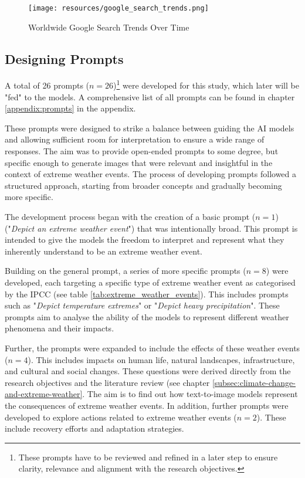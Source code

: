 \begin{figure}[h]
    \centering
    \texttt{[image: resources/google\_search\_trends.png]}
    \caption{Worldwide Google Search Trends Over Time}
    \label{fig:google_search_trends}
\end{figure}

\subsection{Designing Prompts}
\label{subsec:designing-prompts}

A total of 26 prompts ($n=26$)\footnote{These prompts have to be reviewed and refined in a later step to ensure clarity, relevance and alignment with the research objectives. } were developed for this study, which later will be "fed" to the models. A comprehensive list of all prompts can be found in chapter \ref{appendix:prompts} in the appendix.

These prompts were designed to strike a balance between guiding the AI models and allowing sufficient room for interpretation to ensure a wide range of responses. The aim was to provide open-ended prompts to some degree, but specific enough to generate images that were relevant and insightful in the context of extreme weather events. The process of developing prompts followed a structured approach, starting from broader concepts and gradually becoming more specific.

The development process began with the creation of a basic prompt  ($n=1$) ("\textit{Depict an extreme weather event}") that was intentionally broad. This prompt is intended to give the models the freedom to interpret and represent what they inherently understand to be an extreme weather event.

Building on the general prompt, a series of more specific prompts ($n=8$) were developed, each targeting a specific type of extreme weather event as categorised by the IPCC (see table \ref{tab:extreme_weather_events}). This includes prompts such as "\textit{Depict temperature extremes}" or "\textit{Depict heavy precipitation}". These prompts aim to analyse the ability of the models to represent different weather phenomena and their impacts.

Further, the prompts were expanded to include the effects of these weather events ($n=4$). This includes impacts on human life, natural landscapes, infrastructure, and cultural and social changes. These questions were derived directly from the research objectives and the literature review (see chapter \ref{subsec:climate-change-and-extreme-weather}. The aim is to find out how text-to-image models represent the consequences of extreme weather events. In addition, further prompts were developed to explore actions related to extreme weather events ($n=2$). These include recovery efforts and adaptation strategies.

